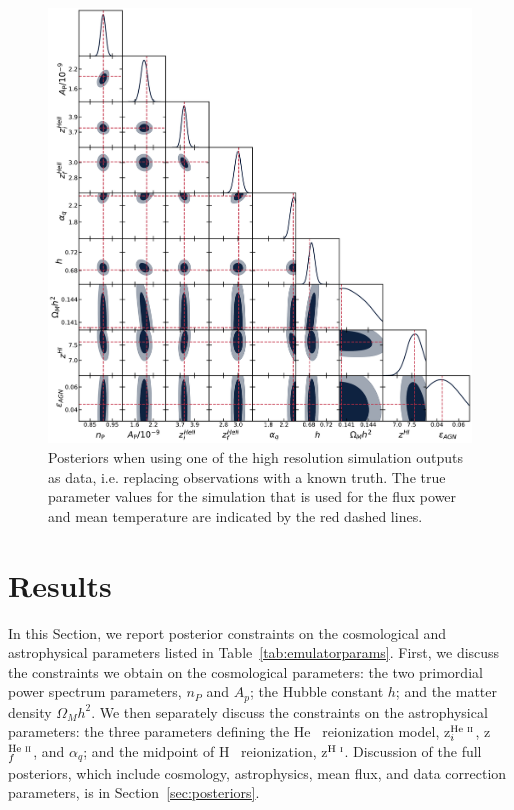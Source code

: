 \documentclass[a4paper,11pt]{article}
\begin{document}
\begin{figure}
    \centering
    \includegraphics[width=\textwidth]{figures/simdat.pdf}
    \caption{\label{fig:simdat_posteriors}
    Posteriors when using one of the high resolution simulation outputs as data, i.e. replacing observations with a known truth.
    The true parameter values for the simulation that is used for the flux power and mean temperature are indicated by the red dashed lines.}
\end{figure}


\section{Results}\label{sec:results}

In this Section, we report posterior constraints on the cosmological and astrophysical parameters listed in Table~\ref{tab:emulatorparams}.
First, we discuss the constraints we obtain on the cosmological parameters: the two primordial power spectrum parameters, $n_P$ and $A_p$; the Hubble constant $h$; and the matter density $\Omega_M h^2$.
We then separately discuss the constraints on the astrophysical parameters: the three parameters defining the He~{} reionization model, z$^{\text{He~{\sc ii}}}_i$, z$^{\text{He~{\sc ii}}}_f$, and $\alpha_q$; and the midpoint of H~{} reionization, z$^{\text{H~{\sc i}}}$.
Discussion of the full posteriors, which include cosmology, astrophysics, mean flux, and data correction parameters, is in Section~\ref{sec:posteriors}.
\end{document}
